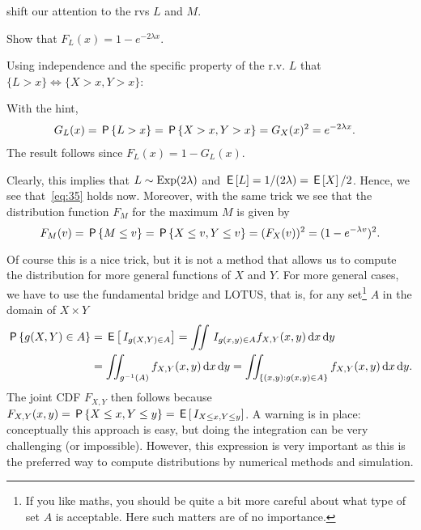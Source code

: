  shift our attention to the rvs $L$ and $M$.


\begin{exercise}
  Show that $F_L(x) = 1-e^{-2\lambda x}$.
\begin{hint}
Using independence and the specific property of the r.v. $L$ that $\{L>x\} \iff \{X>x, Y>x\}$:
\end{hint}
\begin{solution}
With the hint,
 \begin{align*}
G_L(x) = \P{L>x}  &= \P{X>x, Y> x} = G_X(x)^{2} = e^{-2\lambda x}.
  \end{align*}
The result follows since  $F_{L}(x) = 1-G_{L}(x)$.
\end{solution}
\end{exercise}

Clearly, this implies that  $L\sim \Exp{2\lambda}$ and $\E L = 1/(2\lambda) = \E X /2$. Hence, we see that~\cref{eq:35} holds now.
Moreover, with the same trick we see  that the distribution function $F_{M}$ for the maximum $M$ is given by
\begin{equation*}
F_{M}(v) = \P{M\leq v}   = \P{X \leq v, Y \leq v} = (F_{X}(v))^{2} = (1-e^{-\lambda v})^{2}.
\end{equation*}


Of course this is a nice trick, but it is not a method that allows us to compute the distribution for more general functions of $X$ and $Y$.
For more general cases, we have to use the fundamental bridge and LOTUS, that is,
for any set\footnote{If you like maths, you should be quite a bit more careful about what type of set $A$ is acceptable. Here such matters are of no importance.} $A$ in the domain of $X \times Y$
  \begin{equation*}
    \begin{split}
\P{g(X, Y) \in A}
&= \E{\1{g(X,Y)\in A}}
= \iint \1{g(x,y) \in A} f_{X,Y}(x,y) \d x \d y \\
&= \iint_{g^{-1}(A)} f_{X,Y}(x, y) \d x \d y
= \iint_{\{(x,y): g(x,y) \in A\}} f_{X,Y}(x,y) \d x \d y.
    \end{split}
  \end{equation*}
The joint CDF $F_{X,Y}$ then follows because $F_{X,Y}(x,y) = \P{X\leq x, Y\leq y} = \E{\1{X\leq x, Y\leq y}}$.
A warning is in place: conceptually this approach is easy, but doing  the integration can be very challenging (or impossible).  However, this expression is very important as this is the preferred way to compute distributions by numerical methods and simulation.



